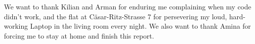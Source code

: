\documentclass{aa}
\newcommand{\TD}[1]{\textcolor{magenta}{\bf [To do] #1}}
\begin{document}



\begin{acknowledgements}
We want to thank Kilian and Arman for enduring me complaining when my code didn't work, and the flat at Cäsar-Ritz-Strasse 7 for persevering my loud, hard-working Laptop in the living room every night. We also want to thank Amina for forcing me to stay at home and finish this report.
\end{acknowledgements}

%
%



\end{document}
